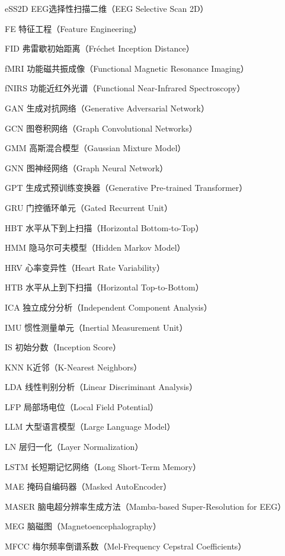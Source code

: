\begin{denotation}
\item[eSS2D] EEG选择性扫描二维（EEG Selective Scan 2D）
\item[FE] 特征工程（Feature Engineering）
\item[FID] 弗雷歇初始距离（Fréchet Inception Distance）
\item[fMRI] 功能磁共振成像（Functional Magnetic Resonance Imaging）
\item[fNIRS] 功能近红外光谱（Functional Near-Infrared Spectroscopy）
\item[GAN] 生成对抗网络（Generative Adversarial Network）
\item[GCN] 图卷积网络（Graph Convolutional Networks）
\item[GMM] 高斯混合模型（Gaussian Mixture Model）
\item[GNN] 图神经网络（Graph Neural Network）
\item[GPT] 生成式预训练变换器（Generative Pre-trained Transformer）
\item[GRU] 门控循环单元（Gated Recurrent Unit）
\item[HBT] 水平从下到上扫描（Horizontal Bottom-to-Top）
\item[HMM] 隐马尔可夫模型（Hidden Markov Model）
\item[HRV] 心率变异性（Heart Rate Variability）
\item[HTB] 水平从上到下扫描（Horizontal Top-to-Bottom）
\item[ICA] 独立成分分析（Independent Component Analysis）
\item[IMU] 惯性测量单元（Inertial Measurement Unit）
\item[IS] 初始分数（Inception Score）
\item[KNN] K近邻（K-Nearest Neighbors）
\item[LDA] 线性判别分析（Linear Discriminant Analysis）
\item[LFP] 局部场电位（Local Field Potential）
\item[LLM] 大型语言模型（Large Language Model）
\item[LN] 层归一化（Layer Normalization）
\item[LSTM] 长短期记忆网络（Long Short-Term Memory）
\item[MAE] 掩码自编码器（Masked AutoEncoder）
\item[MASER] 脑电超分辨率生成方法（Mamba-based Super-Resolution for EEG）
\item[MEG] 脑磁图（Magnetoencephalography）
\item[MFCC] 梅尔频率倒谱系数（Mel-Frequency Cepstral Coefficients）

\end{denotation}
